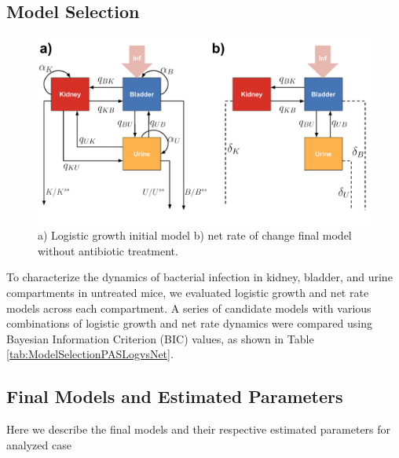 \documentclass{article}
\begin{document}
\subsection{Model Selection}

\begin{figure}
	\centering
	\includegraphics[width=0.8\linewidth]{images/draw_Anoruti_Models_schema.pdf}
	\caption{a) Logistic growth initial model b) net rate of change final model without antibiotic treatment. }
	\label{fig:ModelOnelineNOATB}
\end{figure}


To characterize the dynamics of bacterial infection in kidney, bladder, and urine compartments in untreated mice, we evaluated logistic growth and net rate models across each compartment. A series of candidate models with various combinations of logistic growth and net rate dynamics were compared using Bayesian Information Criterion (BIC) values, as shown in Table \ref{tab:ModelSelectionPASLogvsNet}.







\subsection{Final Models and Estimated Parameters}

Here we describe the final models and their respective estimated parameters for analyzed case
\end{document}
